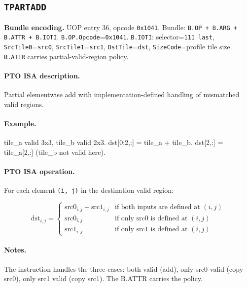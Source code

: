 \subsection{\texttt{TPARTADD}}
\noindent\textbf{Bundle encoding.} UOP entry 36, opcode \texttt{0x1041}. Bundle: \texttt{B.OP + B.ARG + B.ATTR + B.IOTI}. \texttt{B.OP.Opcode}=\texttt{0x1041}. \texttt{B.IOTI}: selector=\texttt{111 last}, \texttt{SrcTile0}=\texttt{src0}, \texttt{SrcTile1}=\texttt{src1}, \texttt{DstTile}=\texttt{dst}, \texttt{SizeCode}=profile tile size. \texttt{B.ATTR} carries partial-valid-region policy.\par\smallskip
{\small
\paragraph{PTO ISA description.}
Partial elementwise add with implementation-defined handling of mismatched valid regions.
\paragraph{Example.}
tile\_a valid 3x3, tile\_b valid 2x3. dst[0:2,:] = tile\_a + tile\_b. dst[2,:] = tile\_a[2,:] (tile\_b not valid here).
\par\smallskip
\paragraph{PTO ISA operation.}
For each element \texttt{(i, j)} in the destination valid region:

\[
\mathrm{dst}_{i,j} =
\begin{cases}
\mathrm{src0}_{i,j} + \mathrm{src1}_{i,j} & \text{if both inputs are defined at } (i,j) \\
\mathrm{src0}_{i,j} & \text{if only src0 is defined at } (i,j) \\
\mathrm{src1}_{i,j} & \text{if only src1 is defined at } (i,j)
\end{cases}
\]
}\par\smallskip
\paragraph{Notes.}
The instruction handles the three cases: both valid (add), only src0 valid (copy src0), only src1 valid (copy src1). The B.ATTR carries the policy.
